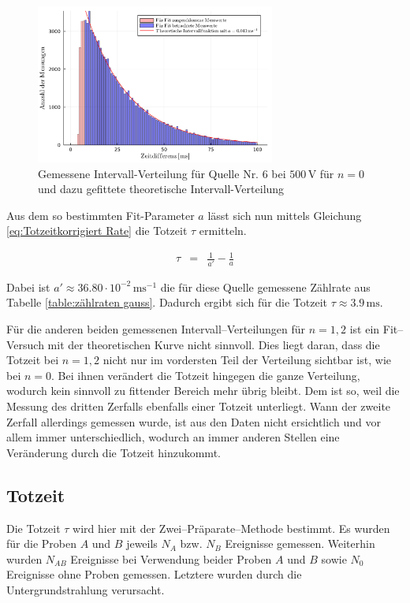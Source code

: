 \documentclass[12pt,a4paper]{scrartcl}
\numberwithin{equation}{section} %
\begin{document}
\begin{figure}
	\centering
	\includegraphics[width=0.7\textwidth]{../media/B3.1/intervalFit.pdf}
	\caption{Gemessene Intervall-Verteilung für Quelle Nr. 6 bei $500 \mathrm{\, V}$ für $n = 0$ und dazu gefittete theoretische Intervall-Verteilung}
	\label{fig:intervalFit}
\end{figure}

Aus dem so bestimmten Fit-Parameter $a$ lässt sich nun mittels Gleichung \eqref{eq:Totzeitkorrigiert Rate} die Totzeit $\tau$ ermitteln.

\begin{eqnarray}
	\tau &=& \frac{1}{a'} - \frac{1}{a}
\end{eqnarray}

\noindent
Dabei ist $a' \approx 36.80 \cdot 10^{-2} \mathrm{\,ms^{-1}}$ die für diese Quelle gemessene Zählrate aus Tabelle \ref{table:zählraten gauss}. Dadurch ergibt sich für die Totzeit $\tau \approx 3.9 \mathrm{\, ms}$.

Für die anderen beiden gemessenen Intervall--Verteilungen für $n = 1,2$ ist ein Fit--Versuch mit der theoretischen Kurve nicht sinnvoll. Dies liegt daran, dass die Totzeit bei $n = 1,2$ nicht nur im vordersten Teil der Verteilung sichtbar ist, wie bei $n = 0$. Bei ihnen verändert die Totzeit hingegen die ganze Verteilung, wodurch kein sinnvoll zu fittender Bereich mehr übrig bleibt. Dem ist so, weil die Messung des dritten Zerfalls ebenfalls einer Totzeit unterliegt. Wann der zweite Zerfall allerdings gemessen wurde, ist aus den Daten nicht ersichtlich und vor allem immer unterschiedlich, wodurch an immer anderen Stellen eine Veränderung durch die Totzeit hinzukommt.

\hypertarget{Totzeit bestimmen}{\subsection{Totzeit}\label{Totzeit bestimmen}}
Die Totzeit $\tau$ wird hier mit der Zwei--Präparate--Methode bestimmt. Es wurden für die Proben $A$ und $B$ jeweils $N_A$ bzw. $N_B$ Ereignisse gemessen. Weiterhin wurden $N_{AB}$ Ereignisse bei Verwendung beider Proben $A$ und $B$ sowie $N_0$ Ereignisse ohne Proben gemessen. Letztere wurden durch die Untergrundstrahlung verursacht.
\end{document}

